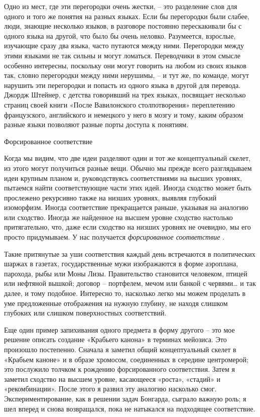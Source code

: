 \documentclass[../main.tex]{subfiles}
\begin{document}
Одно из мест, где эти перегородки очень жестки, \--- это разделение слов для одного и того же понятия на разных языках. Если бы перегородки были слабее, люди, знающие несколько языков, в разговоре постоянно перескакивали бы с одного языка на другой, что было бы очень неловко. Разумеется, взрослые, изучающие сразу два языка, часто путаются между ними. Перегородки между этими языками не так сильны и могут ломаться. Переводчики в этом смысле особенно интересны, поскольку они могут говорить на любом из своих языков так, словно перегородки между ними нерушимы, \--- и тут же, по команде, могут нарушить эти перегородки и попасть из одного языка в другой для перевода. Джордж Штейнер, с детства говоривший на трех языках, посвящает несколько страниц своей книги «После Вавилонского столпотворения» переплетению французского, английского и немецкого у него в мозгу и тому, каким образом разные языки позволяют разные порты доступа к понятиям.

Форсированное соответствие

Когда мы видим, что две идеи разделяют один и тот же концептуальный скелет, из этого могут получиться разные вещи. Обычно мы прежде всего разглядываем идеи крупным планом и, руководствуясь соответствиями на высших уровнях, пытаемся найти соответствующие части этих идей. Иногда сходство может быть прослежено рекурсивно также на низших уровнях, выявляя глубокий изоморфизм. Иногда соответствие прекращается раньше, указывая на аналогию или сходство. Иногда же найденное на высшем уровне сходство настолько притягательно, что, даже если сходство на низших уровнях не очевидно, мы его просто придумываем. У нас получается \emph{форсированное соответствие} .

Такие притянутые за уши соответствия каждый день встречаются в политических шаржах в газетах, государственные мужи изображаются в форме аэроплана, парохода, рыбы или Моны Лизы. Правительство становится человеком, птицей или нефтяной вышкой; договор \--- портфелем, мечом или банкой с червями\ldots{} и так далее, и тому подобное. Интересно то, насколько легко мы можем проделать в уме предложенные отображения на нужную глубину, не находя слишком глубоких или слишком поверхностных соответствий.

Еще один пример запихивания одного предмета в форму другого \--- это мое решение описать создание «Крабьего канона» в терминах мейозиса. Это произошло постепенно. Сначала я заметил общий концептуальный скелет в «Крабьем каноне» и в образе хромосом, соединенных в середине центромерой; это послужило толчком к рождению форсированного соответствия. Затем я заметил сходство на высшем уровне, касающееся «роста», «стадий» и «рекомбинации». После этого я развил эту аналогию насколько смог. Экспериментирование, как в решении задач Бонгарда, сыграло важную роль; я шел вперед и снова возвращался, пока не натыкался на подходящее соответствие.
\end{document}
